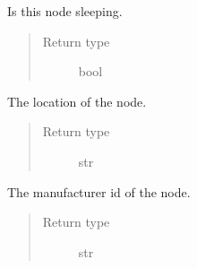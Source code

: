 \documentclass[letterpaper,10pt,english]{sphinxmanual}
\begin{document}
\begin{fulllineitems}
\begin{fulllineitems}
\begin{quote}
\begin{description}
\end{description}\end{quote}

\end{fulllineitems}


\begin{fulllineitems}
\label{node:openzwave.node.ZWaveNode.is_sleeping}
Is this node sleeping.
\begin{quote}\begin{description}
\item[{Return type}] \leavevmode
bool

\end{description}\end{quote}

\end{fulllineitems}


\begin{fulllineitems}
\label{node:openzwave.node.ZWaveNode.location}
The location of the node.
\begin{quote}\begin{description}
\item[{Return type}] \leavevmode
str

\end{description}\end{quote}

\end{fulllineitems}


\begin{fulllineitems}
\label{node:openzwave.node.ZWaveNode.manufacturer_id}
The manufacturer id of the node.
\begin{quote}\begin{description}
\item[{Return type}] \leavevmode
str

\end{description}\end{quote}

\end{fulllineitems}



\end{fulllineitems}
\end{document}
